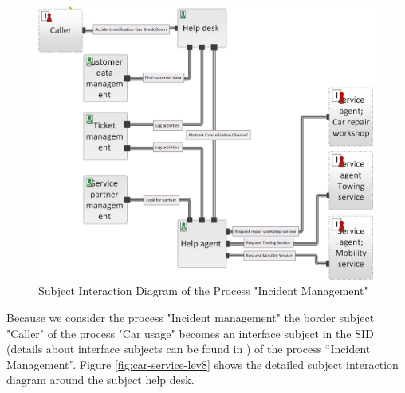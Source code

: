 \begin{figure}[htbp]
	\centering
	\includegraphics[width=1.0\linewidth]{Figures/Chapter5/figures-hierarchy/Car-Service-Lev6}
	\caption[Subject Interaction Diagram of the Process "Incident Management"]{Subject Interaction Diagram of the Process "Incident Management"}
	\label{fig:car-service-lev6}
\end{figure}

Because we consider the process "Incident management" the border subject "Caller" of the process "Car usage" becomes an interface subject in the SID (details about interface subjects can be found in \cite{Flei12}) of the process “Incident Management”. Figure \ref{fig:car-service-lev8} shows the detailed subject interaction diagram around the subject help desk. \\

